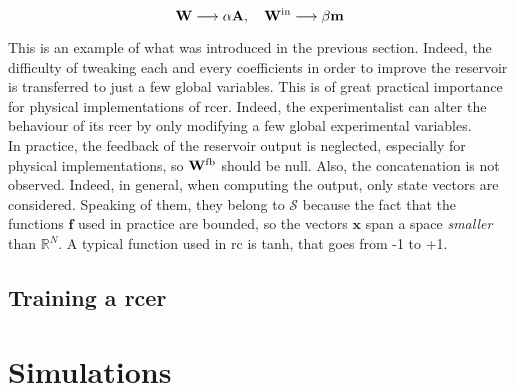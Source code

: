\begin{equation}
	\mathbf{W} \longrightarrow \alpha \mathbf{A}, \quad \mathbf{W}^{\text{in}} \longrightarrow \beta \mathbf{m}
\end{equation}

This is an example of what was introduced in the previous section. Indeed, the difficulty of tweaking each and every coefficients in order to improve the reservoir is transferred to just a few global variables. This is of great practical importance for physical implementations of \gls{rcer}. Indeed, the experimentalist can alter the behaviour of its \gls{rcer} by only modifying a few global experimental variables.\\

In practice, the feedback of the reservoir output is neglected, especially for physical implementations, so $\mathbf{W}^{\text{fb}}$ should be null. Also, the concatenation is not observed. Indeed, in general, when computing the output, only state vectors are considered. Speaking of them, they belong to $\mathcal{S}$ because the fact that the functions $\mathbf{f}$ used in practice are bounded, so the vectors $\mathbf{x}$ span a space \textit{smaller} than $\mathbb{R}^N$. A typical function used in \gls{rc} is tanh, that goes from -1 to +1.


\subsection{Training a \acrshort{rcer}}





\section{Simulations}


